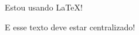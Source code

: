 \documentclass{article}
\begin{document}
        Estou usando \LaTeX{}!
    
        \begin{center}
            E esse texto deve estar centralizado!
        \end{center}

    
\end{document}
